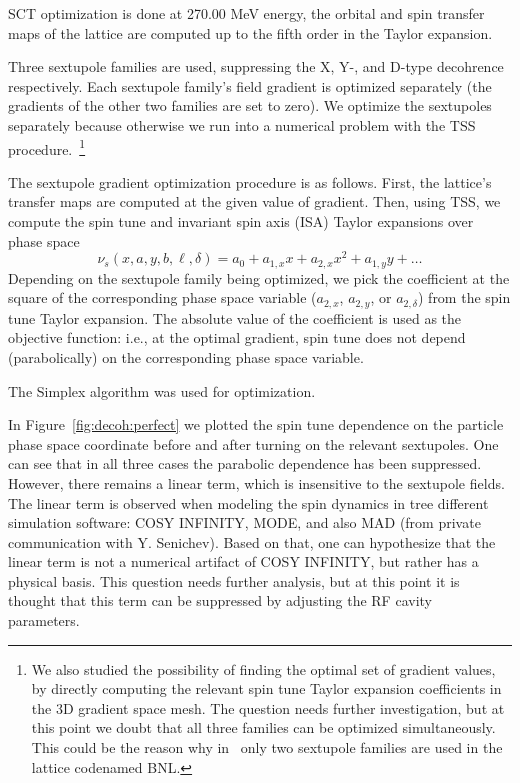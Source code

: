 SCT optimization is done at 270.00 MeV energy, the orbital and spin transfer maps of the lattice
are computed up to the fifth order in the Taylor expansion.

Three sextupole families are used, suppressing the X, Y-, and D-type decohrence respectively.
Each sextupole family's field gradient is optimized separately (the gradients of the other two
families are set to zero). We optimize the sextupoles separately because otherwise we run into a
numerical problem with the TSS procedure.~\footnote{We also studied the possibility of finding the optimal
  set of gradient values, by directly computing the relevant spin tune Taylor expansion coefficients in the
  3D gradient space mesh. The question needs further investigation, but at this point we doubt that all
  three families can be optimized simultaneously. This could be the reason why in~\cite[p.~219]{Eremey:Thesis}
  only two sextupole families are used in the lattice codenamed BNL.}

The sextupole gradient optimization procedure is as follows. First, the lattice's
transfer maps are computed at the given value of gradient. Then, using TSS,
we compute the spin tune and invariant spin axis (ISA) Taylor expansions over phase space
\[
\nu_s(x,a,y,b,\ell,\delta) = a_0 + a_{1,x}x + a_{2,x}x^2 + a_{1,y}y + \dots
\] 
Depending on the sextupole family being optimized, we pick the coefficient at the square of the corresponding 
phase space variable ($a_{2,x}$, $a_{2,y}$, or $a_{2,\delta}$) from the spin tune Taylor expansion. 
The absolute value of the coefficient is used as the objective
function: i.e., at the optimal gradient, spin tune does not depend (parabolically) on the corresponding
phase space variable.

The Simplex algorithm was used for optimization.~\cite[p.~37]{COSYINF:Manual:Programmer}

In Figure~\ref{fig:decoh:perfect} we plotted the spin tune dependence on the particle 
phase space coordinate before and after turning on the relevant sextupoles. One can see that in all
three cases the parabolic dependence has been suppressed. However, there remains a linear term,
which is insensitive to the sextupole fields. The linear term is observed when modeling the spin
dynamics in tree different simulation software: COSY INFINITY, MODE, and also MAD 
(from private communication with Y. Senichev).
Based on that, one can hypothesize that the linear term is not a numerical artifact of  COSY INFINITY,
but rather has a physical basis. This question needs further analysis, but at this point it is thought that
this term can be suppressed by adjusting the RF cavity parameters.~\cite[p.~210,~219]{Eremey:Thesis}

